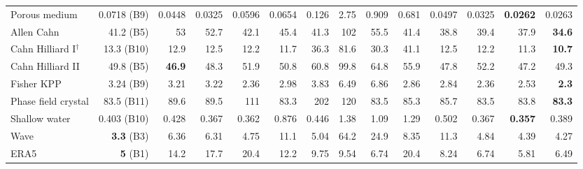 \begin{tabular}{lr|rrrrrrrrr|rrr}
Porous medium & 0.0718 (B9) & 0.0448 & 0.0325 & 0.0596 & 0.0654 & 0.126 & 2.75 & 0.909 & 0.681 & 0.0497 & 0.0325 & \textbf{0.0262} & 0.0263 \\
Allen Cahn & 41.2 (B5) & 53 & 52.7 & 42.1 & 45.4 & 41.3 & 102 & 55.5 & 41.4 & 38.8 & 39.4 & 37.9 & \textbf{34.6} \\
Cahn Hilliard I$^{\dagger}$ & 13.3 (B10) & 12.9 & 12.5 & 12.2 & 11.7 & 36.3 & 81.6 & 30.3 & 41.1 & 12.5 & 12.2 & 11.3 & \textbf{10.7} \\
Cahn Hilliard II & 49.8 (B5) & \textbf{46.9} & 48.3 & 51.9 & 50.8 & 60.8 & 99.8 & 64.8 & 55.9 & 47.8 & 52.2 & 47.2 & 49.3 \\
Fisher KPP & 3.24 (B9) & 3.21 & 3.22 & 2.36 & 2.98 & 3.83 & 6.49 & 6.86 & 2.86 & 2.84 & 2.36 & 2.53 & \textbf{2.3} \\
Phase field crystal & 83.5 (B11) & 89.6 & 89.5 & 111 & 83.3 & 202 & 120 & 83.5 & 85.3 & 85.7 & 83.5 & 83.8 & \textbf{83.3} \\
Shallow water & 0.403 (B10) & 0.428 & 0.367 & 0.362 & 0.876 & 0.446 & 1.38 & 1.09 & 1.29 & 0.502 & 0.367 & \textbf{0.357} & 0.389 \\
Wave & \textbf{3.3} (B3) & 6.36 & 6.31 & 4.75 & 11.1 & 5.04 & 64.2 & 24.9 & 8.35 & 11.3 & 4.84 & 4.39 & 4.27 \\
\midrule ERA5 & \textbf{5} (B1) & 14.2 & 17.7 & 20.4 & 12.2 & 9.75 & 9.54 & 6.74 & 20.4 & 8.24 & 6.74 & 5.81 & 6.49 \\
\bottomrule
\end{tabular}
